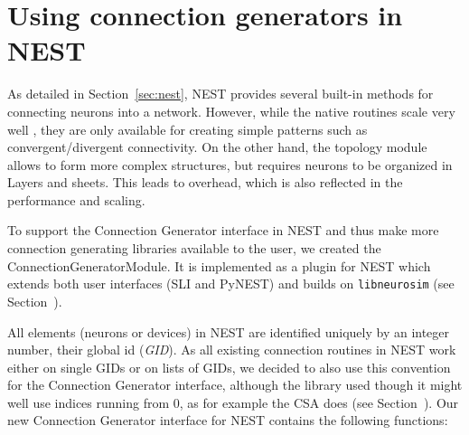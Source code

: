 \documentclass{frontiersSCNS} %
\begin{document}
\section{Using connection generators in NEST}\label{sec:conn_gen_nest}

As detailed in Section~\ref{sec:nest}, NEST provides several built-in
methods for connecting neurons into a network. However, while the
native routines scale very well \citep{Helias12_26}, they are only
available for creating simple patterns such as convergent/divergent
connectivity. On the other hand, the topology module
\citep{Plesser_13} allows to form more complex structures, but
requires neurons to be organized in Layers and sheets. This leads to
overhead, which is also reflected in the performance and scaling.

To support the Connection Generator interface in NEST and thus make
more connection generating libraries available to the user, we created
the ConnectionGeneratorModule. It is implemented as a plugin for NEST
which extends both user interfaces (SLI and PyNEST) and builds on
\verb|libneurosim| (see Section~\label{sec:libneurosim}).

All elements (neurons or devices) in NEST are identified uniquely by
an integer number, their global id (\emph{GID}). As all existing
connection routines in NEST work either on single GIDs or on lists of
GIDs, we decided to also use this convention for the Connection
Generator interface, although the library used though it might well
use indices running from 0, as for example the CSA does (see
Section~\label{sec:csa}). Our new Connection Generator interface for
NEST contains the following functions:
\end{document}
